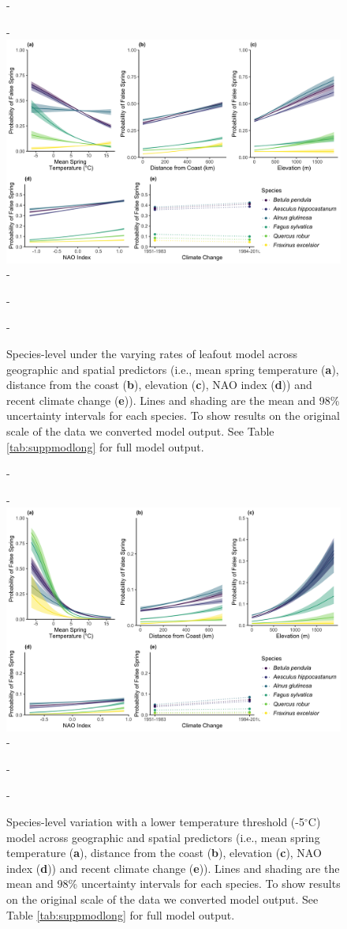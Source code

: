 \documentclass{article}\usepackage[]{graphicx}\usepackage[]{color}
\begin{document}
  {\begin{figure} [H]
  -\begin{center}
  -\includegraphics[width=12cm]{..//..//analyses/figures/InteractionPlots/Species_dvrlong.png}
  -\caption{Species-level under the varying rates of leafout model across geographic and spatial predictors (i.e., mean spring temperature (\textbf{a}), distance from the coast (\textbf{b}), elevation (\textbf{c}), NAO index (\textbf{d})) and recent climate change (\textbf{e})). Lines and shading are the mean and 98\% uncertainty intervals for each species. To show results on the original scale of the data we converted model output. See Table \ref{tab:suppmodlong} for full model output. }\label{fig:sppdvr}
  -\end{center}
  -\end{figure}}


{\begin{figure} [H]
  -\begin{center}
  -\includegraphics[width=12cm]{..//..//analyses/figures/InteractionPlots/Species_fivelong.png}
  -\caption{Species-level variation with a lower temperature threshold (-5$^{\circ}$C) model across geographic and spatial predictors (i.e., mean spring temperature (\textbf{a}), distance from the coast (\textbf{b}), elevation (\textbf{c}), NAO index (\textbf{d})) and recent climate change (\textbf{e})). Lines and shading are the mean and 98\% uncertainty intervals for each species. To show results on the original scale of the data we converted model output. See Table \ref{tab:suppmodlong} for full model output. }\label{fig:sppfive}
  -\end{center}
  -\end{figure}}
\end{document}
